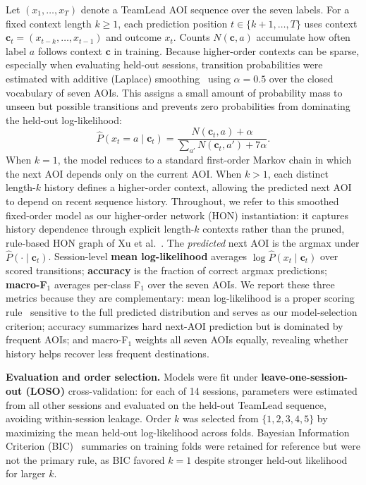 \documentclass[runningheads]{llncs}
\begin{document}
Let $(x_1,\ldots,x_T)$ denote a TeamLead AOI sequence over the seven labels. For a fixed context length $k \geq 1$, each prediction position $t \in \{k+1,\ldots,T\}$ uses context $\mathbf{c}_t = (x_{t-k},\ldots,x_{t-1})$ and outcome $x_t$. Counts $N(\mathbf{c}, a)$ accumulate how often label $a$ follows context $\mathbf{c}$ in training. Because higher-order contexts can be sparse, especially when evaluating held-out sessions, transition probabilities were estimated with additive (Laplace) smoothing~\cite{chen1999empirical} using $\alpha = 0.5$ over the closed vocabulary of seven AOIs. This assigns a small amount of probability mass to unseen but possible transitions and prevents zero probabilities from dominating the held-out log-likelihood:
\[
\widehat{P}(x_t = a \mid \mathbf{c}_t) = \frac{N(\mathbf{c}_t, a) + \alpha}{\sum_{a'} N(\mathbf{c}_t, a') + 7\alpha}.
\]
When $k=1$, the model reduces to a standard first-order Markov chain in which the next AOI depends only on the current AOI. When $k>1$, each distinct length-$k$ history defines a higher-order context, allowing the predicted next AOI to depend on recent sequence history. Throughout, we refer to this smoothed fixed-order model as our higher-order network (HON) instantiation: it captures history dependence through explicit length-$k$ contexts rather than the pruned, rule-based HON graph of Xu et al.~\cite{xuRepresentingHigherorderDependencies2016}. The \emph{predicted} next AOI is the argmax under $\widehat{P}(\cdot \mid \mathbf{c}_t)$. Session-level \textbf{mean log-likelihood} averages $\log \widehat{P}(x_t \mid \mathbf{c}_t)$ over scored transitions; \textbf{accuracy} is the fraction of correct argmax predictions; \textbf{macro-F$_1$} averages per-class F$_1$ over the seven AOIs. We report these three metrics because they are complementary: mean log-likelihood is a proper scoring rule~\cite{gneiting2007strictly} sensitive to the full predicted distribution and serves as our model-selection criterion; accuracy summarizes hard next-AOI prediction but is dominated by frequent AOIs; and macro-F$_1$ weights all seven AOIs equally, revealing whether history helps recover less frequent destinations.

\textbf{Evaluation and order selection.} Models were fit under \textbf{leave-one-session-out (LOSO)} cross-validation: for each of 14 sessions, parameters were estimated from all other sessions and evaluated on the held-out TeamLead sequence, avoiding within-session leakage. Order $k$ was selected from $\{1,2,3,4,5\}$ by maximizing the mean held-out log-likelihood across folds. Bayesian Information Criterion (BIC)~\cite{schwarz1978estimating} summaries on training folds were retained for reference but were not the primary rule, as BIC favored $k{=}1$ despite stronger held-out likelihood for larger $k$.
\end{document}
